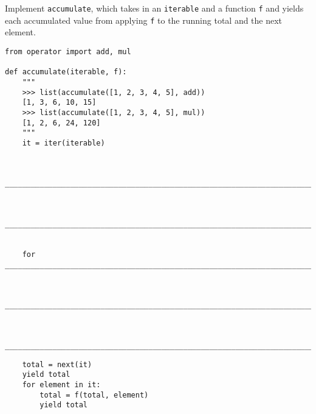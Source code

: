 \begin{blocksection}
\question Implement \lstinline$accumulate$, which takes in an
\lstinline$iterable$ and a function \lstinline$f$ and yields each accumulated
value from applying \lstinline$f$ to the running total and the next element.

\begin{lstlisting}
from operator import add, mul

def accumulate(iterable, f):
    """
    >>> list(accumulate([1, 2, 3, 4, 5], add))
    [1, 3, 6, 10, 15]
    >>> list(accumulate([1, 2, 3, 4, 5], mul))
    [1, 2, 6, 24, 120]
    """
    it = iter(iterable)


    ______________________________________________________________________________


    ______________________________________________________________________________


    for __________________________________________________________________________:


        __________________________________________________________________________


        __________________________________________________________________________
\end{lstlisting}

\begin{solution}[0in]
\begin{lstlisting}
    total = next(it)
    yield total
    for element in it:
        total = f(total, element)
        yield total
\end{lstlisting}
\end{solution}
\end{blocksection}
